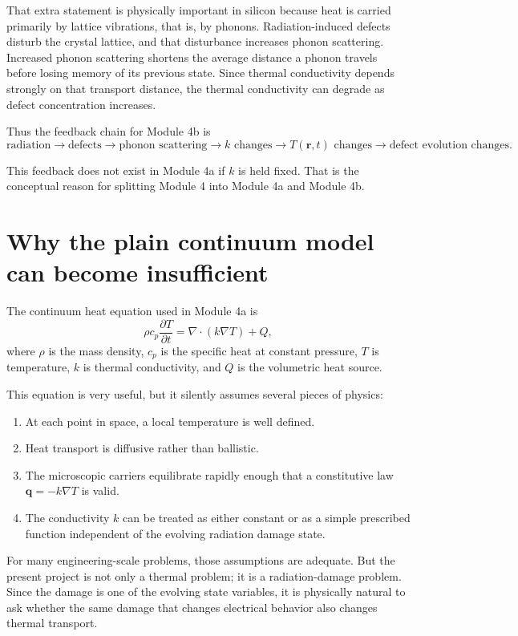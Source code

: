 \documentclass[11pt]{article}
\newcommand{\qvec}{\mathbf{q}}
\newcommand{\rvec}{\mathbf{r}}
\begin{document}
That extra statement is physically important in silicon because heat is carried primarily by lattice vibrations, that is, by phonons. Radiation-induced defects disturb the crystal lattice, and that disturbance increases phonon scattering. Increased phonon scattering shortens the average distance a phonon travels before losing memory of its previous state. Since thermal conductivity depends strongly on that transport distance, the thermal conductivity can degrade as defect concentration increases.

Thus the feedback chain for Module 4b is
\[
\text{radiation} \rightarrow \text{defects} \rightarrow \text{phonon scattering} \rightarrow k \text{ changes} \rightarrow T(\rvec,t) \text{ changes} \rightarrow \text{defect evolution changes.}
\]

This feedback does not exist in Module 4a if $k$ is held fixed. That is the conceptual reason for splitting Module 4 into Module 4a and Module 4b.

\section{Why the plain continuum model can become insufficient}

The continuum heat equation used in Module 4a is
\[
\rho c_p \frac{\partial T}{\partial t} = \nabla\cdot\left(k\nabla T\right) + Q,
\]
where $\rho$ is the mass density, $c_p$ is the specific heat at constant pressure, $T$ is temperature, $k$ is thermal conductivity, and $Q$ is the volumetric heat source.

This equation is very useful, but it silently assumes several pieces of physics:
\begin{enumerate}[label=\arabic*.]
    \item At each point in space, a local temperature is well defined.
    \item Heat transport is diffusive rather than ballistic.
    \item The microscopic carriers equilibrate rapidly enough that a constitutive law $\qvec=-k\nabla T$ is valid.
    \item The conductivity $k$ can be treated as either constant or as a simple prescribed function independent of the evolving radiation damage state.
\end{enumerate}

For many engineering-scale problems, those assumptions are adequate. But the present project is not only a thermal problem; it is a radiation-damage problem. Since the damage is one of the evolving state variables, it is physically natural to ask whether the same damage that changes electrical behavior also changes thermal transport.
\end{document}
